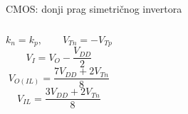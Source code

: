 \begin{frame}[label=09_2-s028]{CMOS: donji prag simetričnog invertora}
\begin{columns}[T,onlytextwidth]\centering {}\[k_n=k_p,\qquad V_{Tn}=-V_{Tp}\]
\[V_I=V_O-\frac{V_{DD}}2\]
\[V_{O(IL)}=\frac{7V_{DD}+2V_{Tn}}8\]
\[V_{IL}=\frac{3V_{DD}+2V_{Tn}}8\]
\end{columns}
\end{frame}
